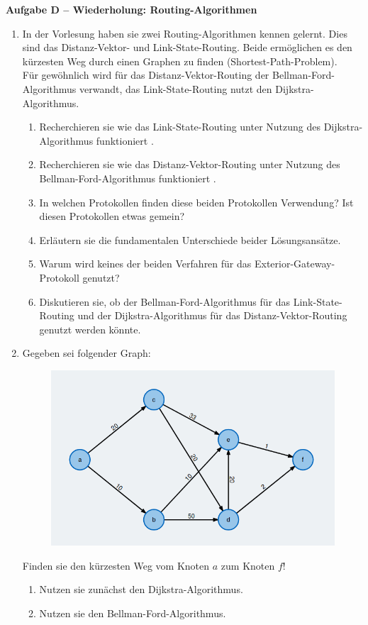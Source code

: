 \documentclass[paper=a4,fontsize=11pt]{scrartcl}%
\numberwithin{equation}{section}
\begin{document}
\begin{center}\Large{\textbf{Aufgabe D -- Wiederholung: Routing-Algorithmen}}\end{center}\vskip0.2in
\begin{enumerate}
	\item In der Vorlesung haben sie zwei Routing-Algorithmen kennen gelernt. Dies sind das Distanz-Vektor- und Link-State-Routing. Beide ermöglichen es den kürzesten Weg durch einen Graphen zu finden (Shortest-Path-Problem).\\
	Für gewöhnlich wird für das Distanz-Vektor-Routing der Bellman-Ford-Algorithmus verwandt, das Link-State-Routing nutzt den Dijkstra-Algorithmus. \cite[S. 363ff]{Kurose2012}
	\begin{enumerate}
		\item Recherchieren sie wie das Link-State-Routing unter Nutzung des Dijkstra-Algorithmus funktioniert \cite[S. 366]{Kurose2012}.
		\item Recherchieren sie wie das Distanz-Vektor-Routing unter Nutzung des Bellman-Ford-Algorithmus funktioniert  \cite[S. 371]{Kurose2012}.
		\item In welchen Protokollen finden diese beiden Protokollen Verwendung? Ist diesen Protokollen etwas gemein?
		\item Erläutern sie die fundamentalen Unterschiede beider Lösungsansätze.
		\item Warum wird keines der beiden Verfahren für das Exterior-Gateway-Protokoll genutzt?
		\item Diskutieren sie, ob der Bellman-Ford-Algorithmus für das Link-State-Routing und der Dijkstra-Algorithmus für das Distanz-Vektor-Routing genutzt werden könnte.
	\end{enumerate}
	\item Gegeben sei folgender Graph:
	\begin{figure}[H]
		\centering
		\includegraphics[scale=0.4]{dijkstra_example}
	\end{figure}
	Finden sie den kürzesten Weg vom Knoten $a$ zum Knoten $f$!
	\begin{enumerate}
		\item Nutzen sie zunächst den Dijkstra-Algorithmus.
		\item Nutzen sie den Bellman-Ford-Algorithmus.
	\end{enumerate}
\end{enumerate}
\end{document}
